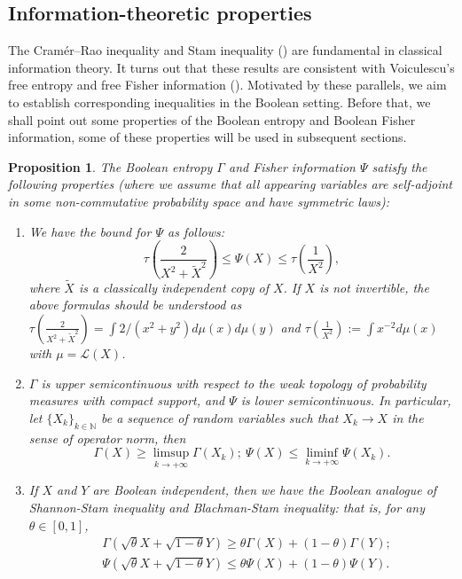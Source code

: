 \documentclass[10pt, reqno]{amsart}
\numberwithin{equation}{section}
\theoremstyle{definition}
\theoremstyle{plain}
\newtheorem{proposition}[definition]{Proposition}
\theoremstyle{remark}
\newcommand{\N}{\mathbb{N}}
\newcommand{\1}{\mathbbm{1}}
\begin{document}
\subsection{Information-theoretic properties}\label{Sec2:booleanentropy}

	The Cramér–Rao inequality and Stam inequality (\cite{stam1959}) are fundamental in classical information theory. It turns out that these results are consistent with Voiculescu's free entropy and free Fisher information (\cite{voiculescu1998analogues}). Motivated by these parallels, we aim to establish corresponding inequalities in the Boolean setting. Before that, we shall point out some properties of the Boolean entropy and Boolean Fisher information, some of these properties will be used in subsequent sections.
	\begin{proposition}\label{prop:infor property}
	 	The Boolean entropy $\Gamma$ and Fisher information $\Psi$ satisfy the following properties  (where we assume that all appearing variables are self-adjoint in some non-commutative probability space and have symmetric laws):
	 	\begin{enumerate}
	 		\item We have the bound for $\Psi$ as follows:
	 		\begin{equation}\label{ineq:fisher bdd}
	 			\tau\left(\frac{2}{X^2+\tilde{X}^2}\right)\le \Psi(X)\le \tau\left( \frac{1}{X^2} \right),
	 		\end{equation}
	 		where $\tilde{X}$ is a classically independent copy of $X$. If $X$ is not invertible, the above formulas should be understood as $\tau\left(\frac{2}{X^2+\tilde{X}^2}\right)=\int 2/(x^2+y^2) d\mu(x)d\mu(y)$ and $\tau\left( \frac{1}{X^2} \right):=\int x^{-2} d\mu(x)$ with $\mu=\mathcal{L}(X)$.
	 		\item $\Gamma$ is upper semicontinuous with respect to the weak topology of probability measures with compact support, and $\Psi$ is lower semicontinuous. In particular, let $\{X_k\}_{k\in \N}$ be a sequence of random variables such that $X_k\to X$ in the sense of operator norm, then
            \begin{equation*}
                \Gamma(X)\ge \limsup_{k\to +\infty}\Gamma(X_k);\ \Psi(X)\le \liminf_{k\to +\infty}\Psi(X_k).
            \end{equation*}
	 		\item If $X$ and $Y$ are Boolean independent, then we have the Boolean analogue of Shannon-Stam inequality and Blachman-Stam inequality: that is, for any $\theta\in [0,1]$,
	 		\begin{align}
	 			&\Gamma(\sqrt{\theta}X + \sqrt{1-\theta}Y) \ge \theta\Gamma(X) + (1-\theta)\Gamma(Y)\label{ineq:SSI};\\
	 			&\Psi(\sqrt{\theta}X + \sqrt{1-\theta}Y)\le \theta\Psi(X) + (1-\theta)\Psi(Y)\label{ineq:BSI}.
	 		\end{align}
	 		
	 	\end{enumerate}
	\end{proposition}
\end{document}
